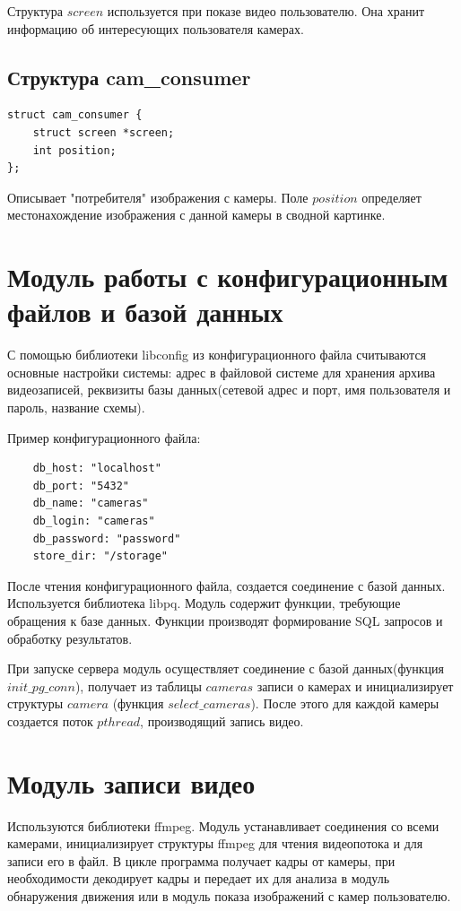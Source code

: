 Структура $screen$ используется при показе видео пользователю.
Она хранит информацию об интересующих пользователя камерах.

\subsection{Структура cam\_consumer}
\begin{verbatim}
struct cam_consumer {
    struct screen *screen;
    int position;
};
\end{verbatim}

Описывает "потребителя" изображения с камеры.
Поле $position$ определяет местонахождение изображения с данной камеры в сводной картинке.

\section{Модуль работы с конфигурационным файлов и базой данных}

С помощью библиотеки libconfig из конфигурационного файла считываются основные настройки системы:
адрес в файловой системе для хранения архива видеозаписей,
реквизиты базы данных(сетевой адрес и порт, имя пользователя и пароль, название схемы).

Пример конфигурационного файла:
\begin{verbatim}
	db_host: "localhost"
	db_port: "5432"
	db_name: "cameras"
	db_login: "cameras"
	db_password: "password"
	store_dir: "/storage"
\end{verbatim}

После чтения конфигурационного файла, создается соединение с базой данных.
Используется библиотека libpq.
Модуль содержит функции, требующие обращения к базе данных.
Функции производят формирование SQL запросов и обработку результатов.

При запуске сервера модуль осуществляет соединение с базой данных(функция $init\_pg\_conn$),
получает из таблицы $cameras$ записи о камерах и инициализирует структуры $camera$
(функция $select\_cameras$). После этого для каждой камеры создается поток $pthread$,
производящий запись видео.

\section{Модуль записи видео}
Используются библиотеки ffmpeg.
Модуль устанавливает соединения со всеми камерами, инициализирует структуры ffmpeg для
чтения видеопотока и для записи его в файл. В цикле программа получает кадры от камеры, при
необходимости декодирует кадры и передает их для анализа в модуль обнаружения движения
или в модуль показа изображений с камер пользователю.

